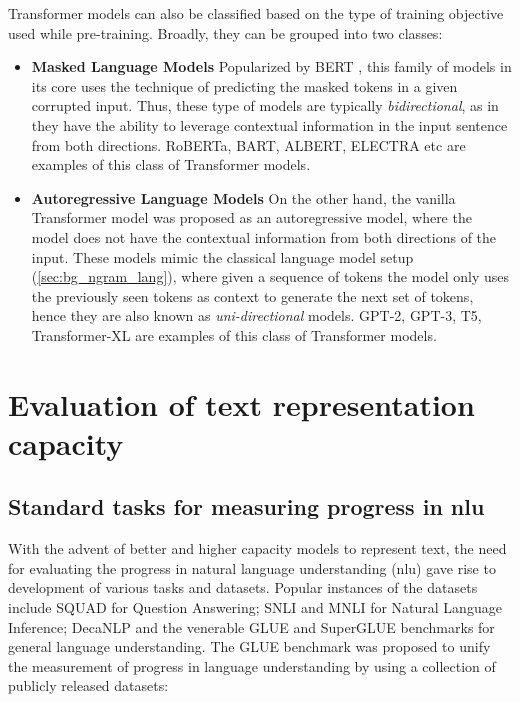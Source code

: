 \documentclass[letterpaper, 12pt]{report}
\begin{document}
Transformer models can also be classified based on the type of training objective used while pre-training. Broadly, they can be grouped into two classes:

\begin{itemize}
  \item \textbf{Masked Language Models} Popularized by BERT \citep{devlin-etal-2019-bert}, this family of models in its core uses the technique of predicting the masked tokens in a given corrupted input. Thus, these type of models are typically \textit{bidirectional}, as in they have the ability to leverage contextual information in the input sentence from both directions. RoBERTa, BART, ALBERT, ELECTRA etc are examples of this class of Transformer models.
  \item \textbf{Autoregressive Language Models} On the other hand, the vanilla Transformer model was proposed as an autoregressive model, where the model does not have the contextual information from both directions of the input. These models mimic the classical language model setup (\autoref{sec:bg_ngram_lang}), where given a sequence of tokens the model only uses the previously seen tokens as context to generate the next set of tokens, hence they are also known as \textit{uni-directional} models. GPT-2, GPT-3, T5, Transformer-XL are examples of this class of Transformer models.
\end{itemize}

\section{Evaluation of text representation capacity}

\subsection{Standard tasks for measuring progress in \acrshort{nlu}}

With the advent of better and higher capacity models to represent text, the need for evaluating the progress in natural language understanding (\acrshort{nlu}) gave rise to development of various tasks and datasets. Popular instances of the datasets include SQUAD \citep{rajpurkar-etal-2016-squad} for Question Answering; SNLI \citep{bowman-etal-2015-large} and MNLI \citep{williams-etal-2018-broad} for Natural Language Inference; DecaNLP \citep{mccann2018natural} and the venerable GLUE \citep{wang-etal-2018-glue} and SuperGLUE \citep{wang-etal-2019-superglue} benchmarks for general language understanding. The GLUE benchmark was proposed to unify the measurement of progress in language understanding by using a collection of publicly released datasets:
\end{document}
